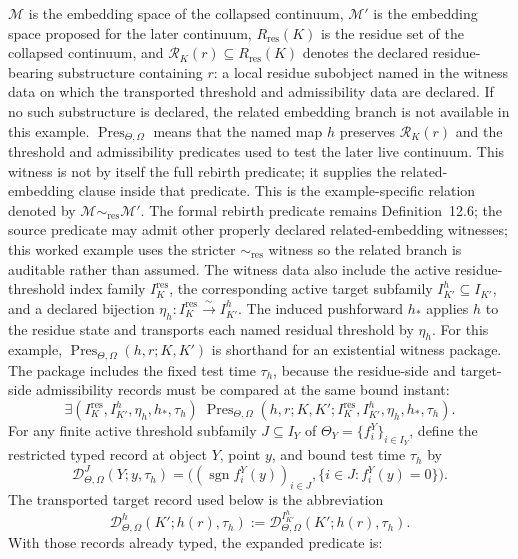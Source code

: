 \(\mathcal{M}\) is the embedding space of the collapsed continuum,
\(\mathcal{M}'\) is the embedding space proposed for the later continuum,
\(R_{\mathrm{res}}(K)\) is the residue set of the collapsed continuum, and
\(\mathcal{R}_K(r)\subseteq R_{\mathrm{res}}(K)\) denotes the declared
residue-bearing substructure containing \(r\): a local residue subobject named
in the witness data on which the transported threshold and admissibility data
are declared. If no such substructure is declared, the related embedding
branch is not available in this example.
\(\operatorname{Pres}_{\Theta,\Omega}\) means that the named map \(h\)
preserves \(\mathcal{R}_K(r)\) and the threshold and admissibility
predicates used to test the later live continuum. This witness is not by
itself the full rebirth predicate; it supplies the related-embedding clause
inside that predicate. This is the
example-specific relation denoted by
\(\mathcal{M}\sim_{\mathrm{res}}\mathcal{M}'\). The formal rebirth predicate
remains Definition~12.6; the source predicate may admit other properly
declared
related-embedding witnesses; this worked example uses the stricter
\(\sim_{\mathrm{res}}\) witness so the related branch is auditable rather than
assumed.
The witness data also include the active residue-threshold index family
\(I_K^{\mathrm{res}}\), the corresponding active target subfamily
\(I_{K'}^{h}\subseteq I_{K'}\), and a declared bijection
\(\eta_h:I_K^{\mathrm{res}}\xrightarrow{\sim}I_{K'}^{h}\). The induced
pushforward \(h_\ast\) applies \(h\) to the residue state and transports each
named residual threshold by \(\eta_h\).
For this example, \(\operatorname{Pres}_{\Theta,\Omega}(h,r;K,K')\) is
shorthand for an existential witness package.  The package includes the fixed
test time \(\tau_h\), because the residue-side and target-side admissibility
records must be compared at the same bound instant:
\[
  \exists(I_K^{\mathrm{res}},I_{K'}^{h},\eta_h,h_\ast,\tau_h)\;
  \operatorname{Pres}_{\Theta,\Omega}
  (h,r;K,K';I_K^{\mathrm{res}},I_{K'}^{h},\eta_h,h_\ast,\tau_h).
\]
For any finite active threshold subfamily \(J\subseteq I_Y\) of
\(\Theta_Y=\{f_i^Y\}_{i\in I_Y}\), define the restricted typed record at
object \(Y\), point \(y\), and bound test time \(\tau_h\) by
\[
  \mathcal{D}^{J}_{\Theta,\Omega}(Y;y,\tau_h)=
  \big(
    (\operatorname{sgn} f_i^Y(y))_{i\in J},
    \{i\in J:f_i^Y(y)=0\}
  \big).
\]
The transported target record used below is the abbreviation
\[
  \mathcal{D}^{h}_{\Theta,\Omega}(K';h(r),\tau_h)
  :=
  \mathcal{D}^{I_{K'}^h}_{\Theta,\Omega}(K';h(r),\tau_h).
\]
With those records already typed, the expanded predicate is:
